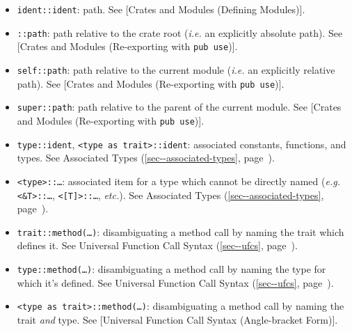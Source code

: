 \documentclass[a4paper,]{book}
\renewcommand*{\hyperref}[2][\ar]{%
  \def\ar{#2}%
  #2 (\autoref{#1}, page~\pageref{#1})}
\begin{document}
\begin{itemize}
\itemsep1pt\parskip0pt
\item
  \texttt{ident::ident}: path. See {[}Crates and Modules (Defining
  Modules){]}.
\item
  \texttt{::path}: path relative to the crate root (\emph{i.e.} an
  explicitly absolute path). See {[}Crates and Modules (Re-exporting
  with \texttt{pub\ use}){]}.
\item
  \texttt{self::path}: path relative to the current module (\emph{i.e.}
  an explicitly relative path). See {[}Crates and Modules (Re-exporting
  with \texttt{pub\ use}){]}.
\item
  \texttt{super::path}: path relative to the parent of the current
  module. See {[}Crates and Modules (Re-exporting with
  \texttt{pub\ use}){]}.
\item
  \texttt{type::ident},
  \texttt{\textless{}type\ as\ trait\textgreater{}::ident}: associated
  constants, functions, and types. See
  \hyperref[sec--associated-types]{Associated Types}.
\item
  \texttt{\textless{}type\textgreater{}::\ldots{}}: associated item for
  a type which cannot be directly named (\emph{e.g.}
  \texttt{\textless{}\&T\textgreater{}::\ldots{}},
  \texttt{\textless{}{[}T{]}\textgreater{}::\ldots{}}, \emph{etc.}). See
  \hyperref[sec--associated-types]{Associated Types}.
\item
  \texttt{trait::method(\ldots{})}: disambiguating a method call by
  naming the trait which defines it. See \hyperref[sec--ufcs]{Universal
  Function Call Syntax}.
\item
  \texttt{type::method(\ldots{})}: disambiguating a method call by
  naming the type for which it's defined. See
  \hyperref[sec--ufcs]{Universal Function Call Syntax}.
\item
  \texttt{\textless{}type\ as\ trait\textgreater{}::method(\ldots{})}:
  disambiguating a method call by naming the trait \emph{and} type. See
  {[}Universal Function Call Syntax (Angle-bracket Form){]}.
\end{itemize}
\end{document}
